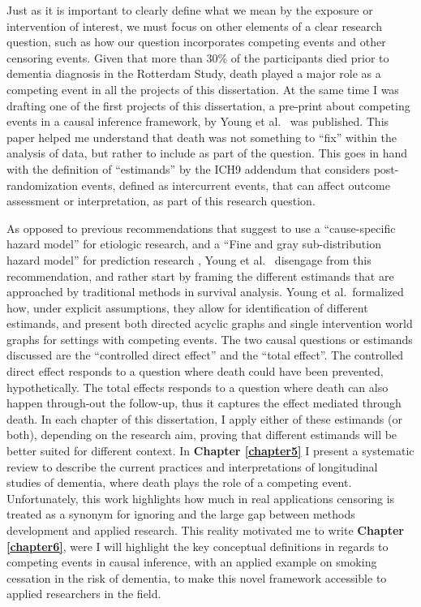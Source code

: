 \documentclass[
]{book}
\begin{document}
Just as it is important to clearly define what we mean by the exposure or intervention of interest, we must focus on other elements of a clear research question, such as how our question incorporates competing events and other censoring events. Given that more than 30\% of the participants died prior to dementia diagnosis in the Rotterdam Study, death played a major role as a competing event in all the projects of this dissertation. At the same time I was drafting one of the first projects of this dissertation, a pre-print about competing events in a causal inference framework, by Young et al.~\autocite{young2020} was published. This paper helped me understand that death was not something to ``fix'' within the analysis of data, but rather to include as part of the question. This goes in hand with the definition of ``estimands'' by the ICH9 addendum \autocite{ich9} that considers post-randomization events, defined as intercurrent events, that can affect outcome assessment or interpretation, as part of this research question.

As opposed to previous recommendations that suggest to use a ``cause-specific hazard model'' for etiologic research, and a ``Fine and gray sub-distribution hazard model'' for prediction research \autocite{lau2009}, Young et al.~\autocite{young2020} disengage from this recommendation, and rather start by framing the different estimands that are approached by traditional methods in survival analysis. Young et al.~formalized how, under explicit assumptions, they allow for identification of different estimands, and present both directed acyclic graphs and single intervention world graphs for settings with competing events. The two causal questions or estimands discussed are the ``controlled direct effect'' and the ``total effect''. The controlled direct effect responds to a question where death could have been prevented, hypothetically. The total effects responds to a question where death can also happen through-out the follow-up, thus it captures the effect mediated through death. In each chapter of this dissertation, I apply either of these estimands (or both), depending on the research aim, proving that different estimands will be better suited for different context. In \textbf{Chapter \ref{chapter5}} I present a systematic review to describe the current practices and interpretations of longitudinal studies of dementia, where death plays the role of a competing event. Unfortunately, this work highlights how much in real applications censoring is treated as a synonym for ignoring and the large gap between methods development and applied research. This reality motivated me to write \textbf{Chapter \ref{chapter6}}, were I will highlight the key conceptual definitions in regards to competing events in causal inference, with an applied example on smoking cessation in the risk of dementia, to make this novel framework accessible to applied researchers in the field.
\end{document}
